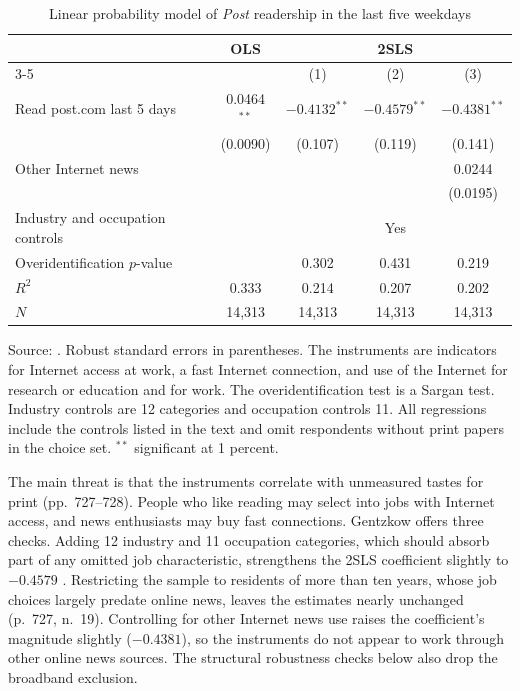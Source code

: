 \begin{table}[htbp]
\centering
\caption{Linear probability model of \textit{Post} readership in the last five weekdays}\label{tab:10-gentzkow-lpm}
\small
\begin{tabular}{@{}lcccc@{}}
\toprule
 & OLS & \multicolumn{3}{c}{2SLS} \\
\cmidrule(l){3-5}
 &  & (1) & (2) & (3) \\
\midrule
Read post.com last 5 days & 0.0464$^{**}$ & $-0.4132^{**}$ & $-0.4579^{**}$ & $-0.4381^{**}$ \\
                          & (0.0090)      & (0.107)        & (0.119)        & (0.141) \\
Other Internet news       &               &                &                & 0.0244 \\
                          &               &                &                & (0.0195) \\
Industry and occupation controls &        &                & Yes            &  \\
Overidentification $p$-value &            & 0.302          & 0.431          & 0.219 \\
$R^2$                     & 0.333         & 0.214          & 0.207          & 0.202 \\
$N$                       & 14,313        & 14,313         & 14,313         & 14,313 \\
\bottomrule
\end{tabular}

\smallskip
\begin{minipage}{0.92\textwidth}
\footnotesize Source: \citet[Table~4]{Gentzkow2007}. Robust standard errors in parentheses. The instruments are
indicators for Internet access at work, a fast Internet connection, and use of the Internet for research or education
and for work. The overidentification test is a Sargan test. Industry controls are 12 categories and occupation
controls 11. All regressions include the controls listed in the text and omit respondents without print papers in the
choice set. $^{**}$ significant at 1 percent.
\end{minipage}
\end{table}

The main threat is that the instruments correlate with unmeasured tastes for print (pp.~727--728). People who like
reading may select into jobs with Internet access, and news enthusiasts may buy fast connections. Gentzkow offers three
checks. Adding 12 industry and 11 occupation categories, which should absorb part of any omitted job characteristic,
strengthens the 2SLS coefficient slightly to $-0.4579$ \citep{AltonjiElderTaber2005}. Restricting the sample to
residents of more than ten years, whose job choices largely predate online news, leaves the estimates nearly unchanged
(p.~727, n.~19). Controlling for other Internet news use raises the coefficient's magnitude slightly ($-0.4381$), so the
instruments do not appear to work through other online news sources. The structural robustness checks below also drop
the broadband exclusion.

